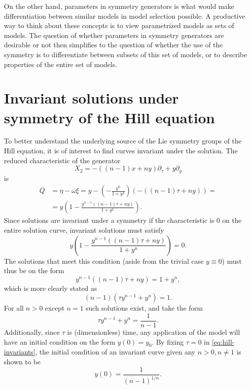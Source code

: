 On the other hand, parameters in symmetry generators is what would make differentiation between similar models in model selection possible.
A productive way to think about these concepts is to view parametrized models as sets of models.
The question of whether parameters in symmetry generators are desirable or not then simplifies to the question of whether the use of the symmetry is to differentiate between subsets of this set of models, or to describe properties of the entire set of models.



\section{Invariant solutions under symmetry of the Hill equation}

To better understand the underlying source of the Lie symmetry groups of the Hill equation, it is of interest to find curves invariant under the solution.
The reduced characteristic of the generator
\begin{equation*}
  X_2 = - \left( (n-1) x + n y \right) \partial_\tau + y \partial_y
\end{equation*}
is
\begin{align*}
  \bar{Q} &= 
  \eta - \omega \xi = 
  y - \left( -\frac{y^n}{1+y^2} \right) \left( - \left( (n-1) \tau + n y \right) \right) =\\
  &= y \left(1 -\frac{y^{n-1} \left( (n-1) \tau + n y \right)}{1+y^2} \right).
\end{align*}
Since solutions are invariant under a symmetry if the characteristic is 0 on the entire solution curve, invariant solutions must satisfy
\begin{equation*}
  y \left(1 -\frac{y^{n-1} \left( (n-1) \tau + n y \right)}{1+y^n} \right) = 0.
\end{equation*}
The solutions that meet this condition (aside from the trivial case \(y \equiv 0\)) must thus be on the form
\begin{equation*}
  y^{n-1} \left( (n-1) \tau + n y \right) = 1+y^n,
\end{equation*}
which is more clearly stated as
\begin{equation*}
  (n-1) \left( \tau y^{n-1} + y^n \right) = 1.
\end{equation*}
For all \(n>0\) except \(n=1\) such solutions exist, and take the form
\begin{equation} \label{eq:hill-invariants}
  \tau y^{n-1} + y^n = \frac{1}{n-1}.
\end{equation}
Additionally, since \(\tau\) is (dimensionless) time, any application of the model will have an initial condition on the form \(y(0) = y_0\).
By fixing \(\tau=0\) in \cref{eq:hill-invariants}, the initial condition of an invariant curve given any \(n>0, n\neq1\) is shown to be
\begin{equation*}
  y(0) =\frac{1}{(n-1)^{1/n}}.
\end{equation*}

